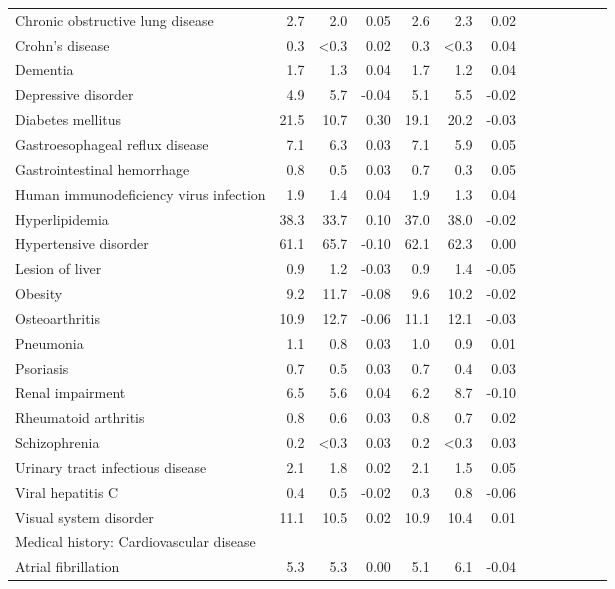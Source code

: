 \documentclass[11pt,]{article}
\begin{document}
\begin{longtable}{lrrrrrrrrrrrr}
      Chronic obstructive lung disease &  2.7 &  2.0 &  0.05 &  2.6 &  2.3 &  0.02 \\ 
      Crohn's disease &  0.3 & <0.3 &  0.02 &  0.3 & <0.3 &  0.04 \\ 
      Dementia &  1.7 &  1.3 &  0.04 &  1.7 &  1.2 &  0.04 \\ 
      Depressive disorder &  4.9 &  5.7 & -0.04 &  5.1 &  5.5 & -0.02 \\ 
      Diabetes mellitus & 21.5 & 10.7 &  0.30 & 19.1 & 20.2 & -0.03 \\ 
      Gastroesophageal reflux disease &  7.1 &  6.3 &  0.03 &  7.1 &  5.9 &  0.05 \\ 
      Gastrointestinal hemorrhage &  0.8 &  0.5 &  0.03 &  0.7 &  0.3 &  0.05 \\ 
      Human immunodeficiency virus infection &  1.9 &  1.4 &  0.04 &  1.9 &  1.3 &  0.04 \\ 
      Hyperlipidemia & 38.3 & 33.7 &  0.10 & 37.0 & 38.0 & -0.02 \\ 
      Hypertensive disorder & 61.1 & 65.7 & -0.10 & 62.1 & 62.3 &  0.00 \\ 
      Lesion of liver &  0.9 &  1.2 & -0.03 &  0.9 &  1.4 & -0.05 \\ 
      Obesity &  9.2 & 11.7 & -0.08 &  9.6 & 10.2 & -0.02 \\ 
      Osteoarthritis & 10.9 & 12.7 & -0.06 & 11.1 & 12.1 & -0.03 \\ 
      Pneumonia &  1.1 &  0.8 &  0.03 &  1.0 &  0.9 &  0.01 \\ 
      Psoriasis &  0.7 &  0.5 &  0.03 &  0.7 &  0.4 &  0.03 \\ 
      Renal impairment &  6.5 &  5.6 &  0.04 &  6.2 &  8.7 & -0.10 \\ 
      Rheumatoid arthritis &  0.8 &  0.6 &  0.03 &  0.8 &  0.7 &  0.02 \\ 
      Schizophrenia &  0.2 & <0.3 &  0.03 &  0.2 & <0.3 &  0.03 \\ 
      Urinary tract infectious disease &  2.1 &  1.8 &  0.02 &  2.1 &  1.5 &  0.05 \\ 
      Viral hepatitis C &  0.4 &  0.5 & -0.02 &  0.3 &  0.8 & -0.06 \\ 
      Visual system disorder & 11.1 & 10.5 &  0.02 & 10.9 & 10.4 &  0.01 \\ 
  Medical history: Cardiovascular disease &    &    &     &    &    &     \\ 
      Atrial fibrillation &  5.3 &  5.3 &  0.00 &  5.1 &  6.1 & -0.04 \\ 

\end{longtable}
\end{document}
